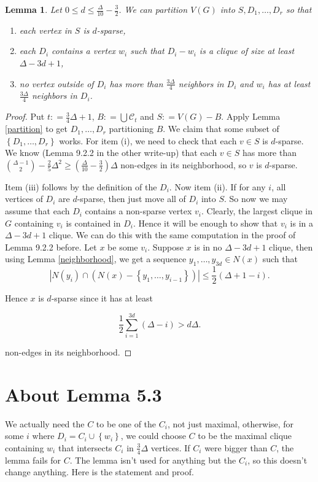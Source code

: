 \documentclass[12pt]{amsart}
\theoremstyle{plain}
\newtheorem{lem}[thm]{Lemma}
\theoremstyle{definition}
\theoremstyle{plain}
\newcommand{\fancy}[1]{\mathcal{#1}}
\newcommand{\CC}{\fancy{C}}
\newcommand{\set}[1]{\left\{ #1 \right\}}
\newcommand{\card}[1]{\left|#1\right|}
\newcommand{\DefinedAs}{\mathrel{\mathop:}=}
\begin{document}
\begin{lem}\label{improved}
Let $0 \leq d \leq \frac{\Delta}{10} - \frac32$. We can partition $V(G)$ into $S,D_1, \ldots, D_r$ so that

\begin{enumerate}
\item each vertex in $S$ is $d$-sparse,
\item each $D_i$ contains a vertex $w_i$ such that $D_i - w_i$ is a clique of size at least $\Delta - 3d + 1$,
\item no vertex outside of $D_i$ has more than $\frac{3\Delta}{4}$ neighbors in $D_i$ and $w_i$ has at least $\frac{3\Delta}{4}$ neighbors in $D_i$.
\end{enumerate}
\end{lem}
\begin{proof}
Put $t \DefinedAs \frac34 \Delta + 1$, $B \DefinedAs \bigcup \CC_t$ and $S \DefinedAs V(G) - B$. Apply Lemma \ref{partition} to get $D_1, \ldots, D_r$ partitioning $B$. We claim that some subset of $\set{D_1, \ldots, D_r}$ works.  For item (i), we need to check that each $v \in S$ is $d$-sparse.  We know (Lemma 9.2.2 in the other write-up) that each $v \in S$ has more than $\binom{\Delta-1}{2} - \frac25 \Delta^2 \geq ( \frac{\Delta}{10} - \frac32)\Delta$ non-edges in its neighborhood, so $v$ is $d$-sparse.

Item (iii) follows by the definition of the $D_i$.  Now item (ii).  If for any $i$, all vertices of $D_i$ are $d$-sparse, then just move all of $D_i$ into $S$.  So now we may assume that each $D_i$ contains a non-sparse vertex $v_i$.  Clearly, the largest clique in $G$ containing $v_i$ is contained in $D_i$.  Hence it will be enough to show that $v_i$ is in a $\Delta - 3d + 1$ clique.  We can do this with the same computation in the proof of Lemma 9.2.2 before.  Let $x$ be some $v_i$. Suppose $x$ is in no $\Delta - 3d + 1$ clique, then using Lemma \ref{neighborhood}, we get a sequence $y_1,
\ldots, y_{3d} \in N(x)$ such that 
\[\card{N(y_i) \cap (N(x) - \set{y_1, \ldots, y_{i-1}})} \leq \frac12 (\Delta + 1 - i).\]

Hence $x$ is $d$-sparse since it has at least 

\[\frac12\sum_{i=1}^{3d} (\Delta - i) > d\Delta.\]

non-edges in its neighborhood.
\end{proof}

\section{About Lemma 5.3}
We actually need the $C$ to be one of the $C_i$, not just maximal, otherwise, for some $i$ where $D_i = C_i \cup \set{w_i}$, we could choose $C$ to be the maximal clique containing $w_i$ that intersects $C_i$ in $\frac34 \Delta$ vertices.  If $C_i$ were bigger than $C$, the lemma fails for $C$.  The lemma isn't used for anything but the $C_i$, so this doesn't change anything.  Here is the statement and proof.
\end{document}
